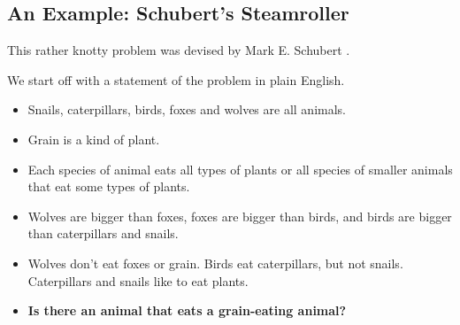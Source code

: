 \subsection{An Example: Schubert's Steamroller}

This rather knotty problem was devised by Mark E. Schubert \XXX{}.

We start off with a statement of the problem in plain English.
\begin{itemize}
\item Snails, caterpillars, birds, foxes and wolves are all animals.
\item Grain is a kind of plant.
\item Each species of animal eats all types of plants
or all species of smaller animals that eat some types of plants.
\item Wolves are bigger than foxes, foxes are bigger than birds, and
birds are bigger than caterpillars and snails.
\item Wolves don't eat foxes or grain.  Birds eat caterpillars, but not snails.
Caterpillars and snails like to eat plants.
\item \textbf{Is there an animal that eats a grain-eating animal?}
\end{itemize}

